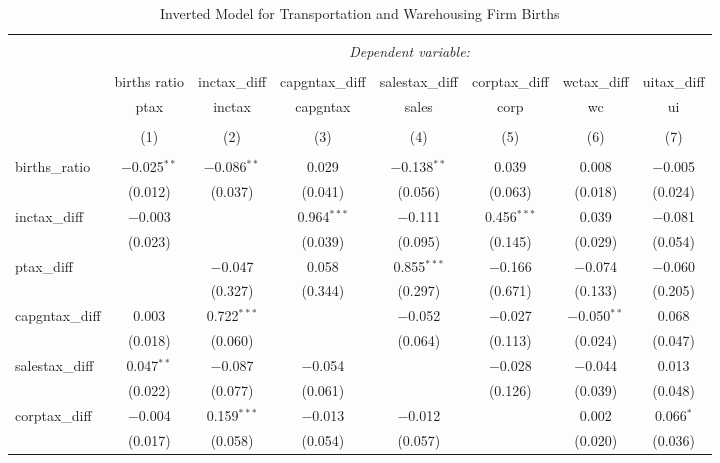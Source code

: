 
\begin{table}[!htbp] \centering 
  \caption{Inverted Model for  Transportation and Warehousing Firm Births} 
  \label{48-49rd} 
\footnotesize 
\begin{tabular}{@{\extracolsep{5pt}}lccccccc} 
\\[-1.8ex]\hline 
\hline \\[-1.8ex] 
 & \multicolumn{7}{c}{\textit{Dependent variable:}} \\ 
\cline{2-8} 
\\[-1.8ex] & births ratio & inctax\_diff & capgntax\_diff & salestax\_diff & corptax\_diff & wctax\_diff & uitax\_diff \\ 
 & ptax & inctax & capgntax & sales & corp & wc & ui \\ 
\\[-1.8ex] & (1) & (2) & (3) & (4) & (5) & (6) & (7)\\ 
\hline \\[-1.8ex] 
 births\_ratio & $-$0.025$^{**}$ & $-$0.086$^{**}$ & 0.029 & $-$0.138$^{**}$ & 0.039 & 0.008 & $-$0.005 \\ 
  & (0.012) & (0.037) & (0.041) & (0.056) & (0.063) & (0.018) & (0.024) \\ 
  inctax\_diff & $-$0.003 &  & 0.964$^{***}$ & $-$0.111 & 0.456$^{***}$ & 0.039 & $-$0.081 \\ 
  & (0.023) &  & (0.039) & (0.095) & (0.145) & (0.029) & (0.054) \\ 
  ptax\_diff &  & $-$0.047 & 0.058 & 0.855$^{***}$ & $-$0.166 & $-$0.074 & $-$0.060 \\ 
  &  & (0.327) & (0.344) & (0.297) & (0.671) & (0.133) & (0.205) \\ 
  capgntax\_diff & 0.003 & 0.722$^{***}$ &  & $-$0.052 & $-$0.027 & $-$0.050$^{**}$ & 0.068 \\ 
  & (0.018) & (0.060) &  & (0.064) & (0.113) & (0.024) & (0.047) \\ 
  salestax\_diff & 0.047$^{**}$ & $-$0.087 & $-$0.054 &  & $-$0.028 & $-$0.044 & 0.013 \\ 
  & (0.022) & (0.077) & (0.061) &  & (0.126) & (0.039) & (0.048) \\ 
  corptax\_diff & $-$0.004 & 0.159$^{***}$ & $-$0.013 & $-$0.012 &  & 0.002 & 0.066$^{*}$ \\ 
  & (0.017) & (0.058) & (0.054) & (0.057) &  & (0.020) & (0.036) \\ 

\end{tabular}
\end{table}
